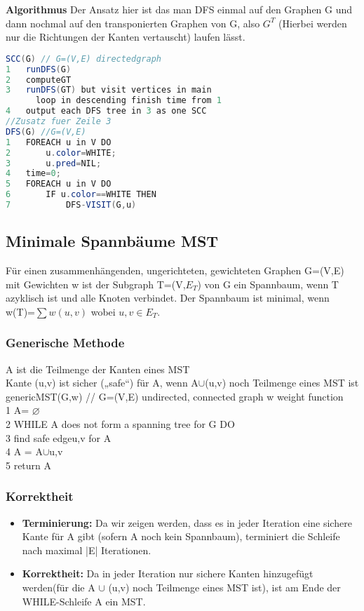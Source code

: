 \documentclass[jou,apacite]{apa6}
\begin{document}
{\bfseries Algorithmus}
Der Ansatz hier ist das man DFS einmal auf den Graphen G und dann nochmal auf den transponierten Graphen von G, also $G^{T}$ (Hierbei werden nur die Richtungen der Kanten vertauscht) laufen lässt.
\begin{lstlisting}[language=java]
SCC(G) // G=(V,E) directedgraph
1   runDFS(G) 
2   computeGT
3   runDFS(GT) but visit vertices in main 
      loop in descending finish time from 1
4   output each DFS tree in 3 as one SCC
//Zusatz fuer Zeile 3
DFS(G) //G=(V,E)
1   FOREACH u in V DO
2       u.color=WHITE; 
3       u.pred=NIL;
4   time=0; 
5   FOREACH u in V DO
6       IF u.color==WHITE THEN
7           DFS-VISIT(G,u)

\end{lstlisting}

\subsection{Minimale Spannbäume MST}
Für einen zusammenhängenden, ungerichteten, gewichteten Graphen G=(V,E) mit Gewichten w ist der Subgraph T=(V,$E_{T}$) von G ein Spannbaum, wenn T azyklisch ist und alle Knoten verbindet. Der Spannbaum ist minimal, wenn w(T)=$\sum{w({u,v})} $ wobei ${u,v}\in E_{T}$.
\subsubsection{Generische Methode}
A ist die Teilmenge der Kanten eines MST\\
Kante (u,v) ist sicher („safe“) für A, wenn A$\cup${(u,v)} noch Teilmenge eines MST ist\\
genericMST(G,w) // G=(V,E) undirected, connected graph w weight function \\
1   A= $\varnothing$\\
2   WHILE A does not form a spanning tree for G DO\\
3       find safe edge{u,v} for A\\
4       A = A$\cup${{u,v}}\\
5   return A\\

\subsubsection{Korrektheit}
\begin{itemize}
    \item {\bfseries Terminierung: } Da wir zeigen werden, dass es in jeder Iteration eine sichere Kante für A gibt (sofern A noch kein Spannbaum), terminiert die Schleife nach maximal |E| Iterationen.
    \item {\bfseries Korrektheit: } Da in jeder Iteration nur sichere Kanten hinzugefügt werden(für die A $\cup$ {(u,v)} noch Teilmenge eines MST ist), ist am Ende der WHILE-Schleife A ein MST.
\end{itemize}
\end{document}
